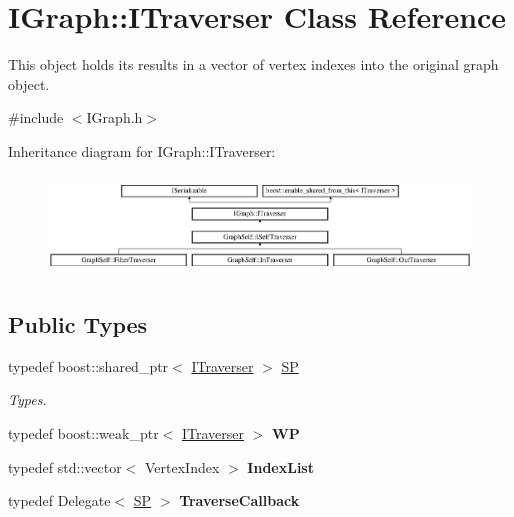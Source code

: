 \hypertarget{class_i_graph_1_1_i_traverser}{}\section{I\+Graph\+:\+:I\+Traverser Class Reference}
\label{class_i_graph_1_1_i_traverser}


This object holds it\textquotesingle{}s results in a vector of vertex indexes into the original graph object.  




{\ttfamily \#include $<$I\+Graph.\+h$>$}

Inheritance diagram for I\+Graph\+:\+:I\+Traverser\+:\begin{figure}[H]
\begin{center}
\leavevmode
\includegraphics[height=2.657177cm]{class_i_graph_1_1_i_traverser}
\end{center}
\end{figure}
\subsection*{Public Types}
\begin{DoxyCompactItemize}
\item 
\mbox{\label{class_i_graph_1_1_i_traverser_a5a5ccc81423d6024742d1898a310d812}} 
typedef boost\+::shared\+\_\+ptr$<$ \hyperlink{class_i_graph_1_1_i_traverser}{I\+Traverser} $>$ \hyperlink{class_i_graph_1_1_i_traverser_a5a5ccc81423d6024742d1898a310d812}{SP}
\begin{DoxyCompactList}\small\item\em Types. \end{DoxyCompactList}\item 
\mbox{\label{class_i_graph_1_1_i_traverser_a476855fae4d53ba084ad2ee8a8284d4f}} 
typedef boost\+::weak\+\_\+ptr$<$ \hyperlink{class_i_graph_1_1_i_traverser}{I\+Traverser} $>$ {\bfseries WP}
\item 
\mbox{\label{class_i_graph_1_1_i_traverser_a3b662c97c3feccb71ab5445faba3e864}} 
typedef std\+::vector$<$ Vertex\+Index $>$ {\bfseries Index\+List}
\item 
\mbox{\label{class_i_graph_1_1_i_traverser_a7a26faf45c540f122ac8c26b20735afa}} 
typedef Delegate$<$ \hyperlink{class_i_graph_1_1_i_traverser_a5a5ccc81423d6024742d1898a310d812}{SP} $>$ {\bfseries Traverse\+Callback}
\end{DoxyCompactItemize}
